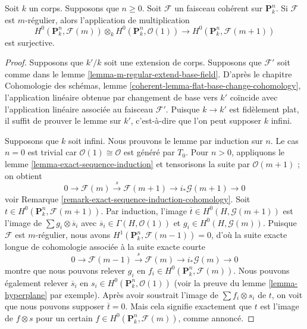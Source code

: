 \begin{lemma}
\label{lemma-m-regular-multiply}
Soit $k$ un corps. Supposons que $n \geq 0$. Soit
$\mathcal{F}$ un faisceau cohérent sur $\mathbf{P}^n_k$. Si
$\mathcal{F}$ est $m$-régulier, alors l'application de multiplication
$$
H^0(\mathbf{P}^n_k, \mathcal{F}(m)) \otimes_k
H^0(\mathbf{P}^n_k, \mathcal{O}(1))
\longrightarrow
H^0(\mathbf{P}^n_k, \mathcal{F}(m + 1))
$$
est surjective.
\end{lemma}

\begin{proof}
Supposons que $k'/k$ soit une extension de corps. Supposons que
$\mathcal{F}'$ soit comme dans le lemme
\ref{lemma-m-regular-extend-base-field}. D'après le chapitre Cohomologie des schémas,
lemme \ref{coherent-lemma-flat-base-change-cohomology}, l'application linéaire obtenue
par changement de base vers $k'$ coïncide avec l'application linéaire associée au
faisceau $\mathcal{F}'$. Puisque $k \to k'$ est fidèlement plat, il suffit de
prouver le lemme sur $k'$, c'est-à-dire que l'on peut supposer $k$ infini.

\medskip\noindent
Supposons que $k$ soit infini. Nous prouvons le lemme par
induction sur $n$. Le cas $n = 0$ est trivial car
$\mathcal{O}(1) \cong \mathcal{O}$ est généré par $T_0$. Pour
$n > 0$, appliquons le lemme \ref{lemma-exact-sequence-induction}
et tensorisons la suite par $\mathcal{O}(m + 1)$ ; on obtient
$$
0 \to \mathcal{F}(m) \xrightarrow{s} \mathcal{F}(m + 1) \to
i_*\mathcal{G}(m + 1) \to 0
$$
voir Remarque
\ref{remark-exact-sequence-induction-cohomology}. Soit $t \in
H^0(\mathbf{P}^n_k, \mathcal{F}(m + 1))$. Par induction, l'image
$\overline{t} \in H^0(H, \mathcal{G}(m + 1))$ est l'image de $\sum g_i
\otimes \overline{s}_i$ avec $\overline{s}_i \in \Gamma(H,
\mathcal{O}(1))$ et $g_i \in H^0(H, \mathcal{G}(m))$. Puisque $\mathcal{F}$
est $m$-régulier, nous avons $H^1(\mathbf{P}^n_k, \mathcal{F}(m - 1)) = 0$,
d'où la suite exacte longue de cohomologie associée à la suite exacte courte
$$
0 \to \mathcal{F}(m - 1) \xrightarrow{s} \mathcal{F}(m) \to
i_*\mathcal{G}(m) \to 0
$$
montre que nous pouvons relever $g_i$ en $f_i \in
H^0(\mathbf{P}^n_k, \mathcal{F}(m))$. Nous pouvons également
relever $\overline{s}_i$ en $s_i \in H^0(\mathbf{P}^n_k,
\mathcal{O}(1))$ (voir la preuve du lemme \ref{lemma-hyperplane} par
exemple). Après avoir soustrait l'image de $\sum f_i \otimes s_i$ de
$t$, on voit que nous pouvons supposer $\overline{t} = 0$. Mais
cela signifie exactement que $t$ est l'image de $f \otimes s$ pour un
certain $f \in H^0(\mathbf{P}^n_k, \mathcal{F}(m))$, comme annoncé.
\end{proof}

